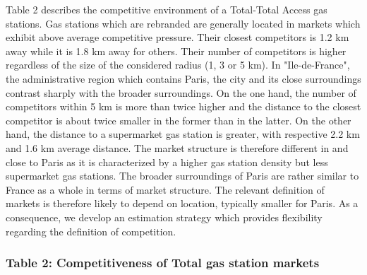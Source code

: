 \documentclass[english]{article}
\begin{document}
Table 2 describes the competitive environment of a Total-Total Access gas stations. Gas stations which are rebranded are generally located in markets which exhibit above average competitive pressure. Their closest competitors is 1.2 km away while it is 1.8 km away for others. Their number of competitors is higher regardless of the size of the considered radius (1, 3 or 5 km). In "Ile-de-France", the administrative region which contains Paris, the city and its close surroundings contrast sharply with the broader surroundings. On the one hand, the number of competitors within 5 km is more than twice higher and the distance to the closest competitor is about twice smaller in the former than in the latter. On the other hand, the distance to a supermarket gas station is greater, with respective 2.2 km and 1.6 km average distance. The market structure is therefore different in and close to Paris as it is characterized by a higher gas station density but less supermarket gas stations. The broader surroundings of Paris are rather similar to France as a whole in terms of market structure. The relevant definition of markets is therefore likely to depend on location, typically smaller for Paris. As a consequence, we develop an estimation strategy which provides flexibility regarding the definition of competition.
\medskip{}

\subsubsection*{Table 2: Competitiveness of Total gas station markets}
\end{document}
